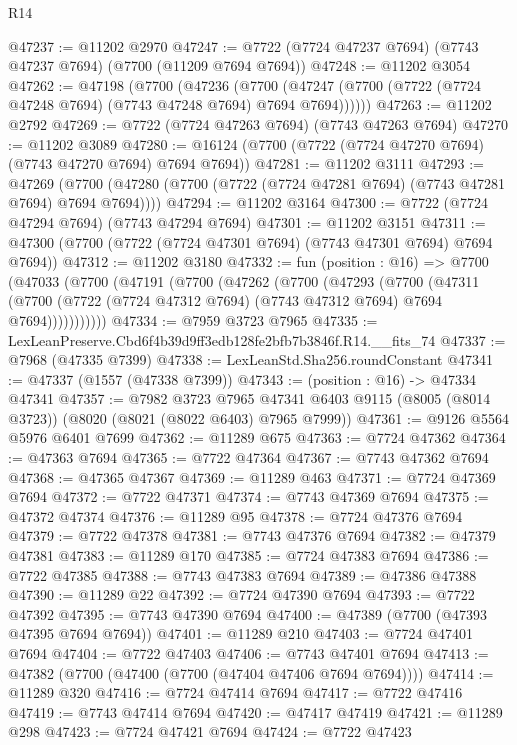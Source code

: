 \begin{lexlean}{R14}
\begin{coremodule}
@47237 := @11202 @2970
@47247 := @7722 (@7724 @47237 @7694) (@7743 @47237 @7694) (@7700 (@11209 @7694 @7694))
@47248 := @11202 @3054
@47262 := @47198
    (@7700
      (@47236
        (@7700 (@47247 (@7700 (@7722 (@7724 @47248 @7694) (@7743 @47248 @7694) @7694 @7694))))))
@47263 := @11202 @2792
@47269 := @7722 (@7724 @47263 @7694) (@7743 @47263 @7694)
@47270 := @11202 @3089
@47280 := @16124 (@7700 (@7722 (@7724 @47270 @7694) (@7743 @47270 @7694) @7694 @7694))
@47281 := @11202 @3111
@47293 := @47269
    (@7700 (@47280 (@7700 (@7722 (@7724 @47281 @7694) (@7743 @47281 @7694) @7694 @7694))))
@47294 := @11202 @3164
@47300 := @7722 (@7724 @47294 @7694) (@7743 @47294 @7694)
@47301 := @11202 @3151
@47311 := @47300 (@7700 (@7722 (@7724 @47301 @7694) (@7743 @47301 @7694) @7694 @7694))
@47312 := @11202 @3180
@47332 := fun (position : @16) =>
  @7700
    (@47033
      (@7700
        (@47191
          (@7700
            (@47262
              (@7700
                (@47293
                  (@7700
                    (@47311
                      (@7700 (@7722 (@7724 @47312 @7694) (@7743 @47312 @7694) @7694 @7694)))))))))))
@47334 := @7959 @3723 @7965
@47335 := LexLeanPreserve.Cbd6f4b39d9ff3edb128fe2bfb7b3846f.R14.__fits_74
@47337 := @7968 (@47335 @7399)
@47338 := LexLeanStd.Sha256.roundConstant
@47341 := @47337 (@1557 (@47338 @7399))
@47343 := (position : @16) -> @47334 @47341
@47357 := @7982
    @3723
    @7965
    @47341
    @6403
    @9115
    (@8005 (@8014 @3723))
    (@8020 (@8021 (@8022 @6403) @7965 @7999))
@47361 := @9126 @5564 @5976 @6401 @7699
@47362 := @11289 @675
@47363 := @7724 @47362
@47364 := @47363 @7694
@47365 := @7722 @47364
@47367 := @7743 @47362 @7694
@47368 := @47365 @47367
@47369 := @11289 @463
@47371 := @7724 @47369 @7694
@47372 := @7722 @47371
@47374 := @7743 @47369 @7694
@47375 := @47372 @47374
@47376 := @11289 @95
@47378 := @7724 @47376 @7694
@47379 := @7722 @47378
@47381 := @7743 @47376 @7694
@47382 := @47379 @47381
@47383 := @11289 @170
@47385 := @7724 @47383 @7694
@47386 := @7722 @47385
@47388 := @7743 @47383 @7694
@47389 := @47386 @47388
@47390 := @11289 @22
@47392 := @7724 @47390 @7694
@47393 := @7722 @47392
@47395 := @7743 @47390 @7694
@47400 := @47389 (@7700 (@47393 @47395 @7694 @7694))
@47401 := @11289 @210
@47403 := @7724 @47401 @7694
@47404 := @7722 @47403
@47406 := @7743 @47401 @7694
@47413 := @47382 (@7700 (@47400 (@7700 (@47404 @47406 @7694 @7694))))
@47414 := @11289 @320
@47416 := @7724 @47414 @7694
@47417 := @7722 @47416
@47419 := @7743 @47414 @7694
@47420 := @47417 @47419
@47421 := @11289 @298
@47423 := @7724 @47421 @7694
@47424 := @7722 @47423

\end{coremodule}
\end{lexlean}
